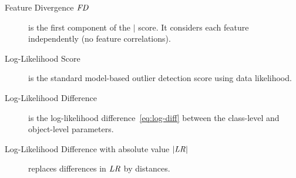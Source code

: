 		\begin{description}
			\item[Feature Divergence $\it{FD}$] is the first  component of the $\mid$ score. It considers each feature independently (no feature correlations).
			\item[Log-Likelihood Score \loglikelihood] is the standard model-based outlier detection score using data likelihood.
			\item[Log-Likelihood Difference \lr] is the log-likelihood difference~\eqref{eq:log-diff} between the class-level and object-level parameters. %
			\item[Log-Likelihood Difference with absolute value $|\it{LR}|$] replaces differences in $\it{LR}$ by distances.
		\end{description}
		
		
		
